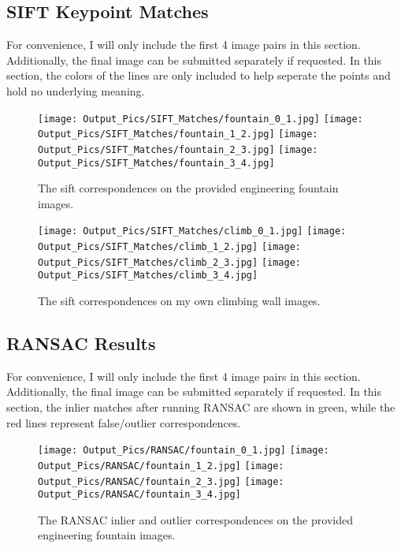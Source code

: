 \documentclass{article}
\begin{document}
\subsection{SIFT Keypoint Matches}
For convenience, I will only include the first 4 image pairs in this section. Additionally, the final image can be submitted separately if requested. In this section, the colors of the lines are only included to help seperate the points and hold no underlying meaning.
\begin{figure}[H]
    \centering
    \texttt{[image: Output\_Pics/SIFT\_Matches/fountain\_0\_1.jpg]}
    \texttt{[image: Output\_Pics/SIFT\_Matches/fountain\_1\_2.jpg]}
    \texttt{[image: Output\_Pics/SIFT\_Matches/fountain\_2\_3.jpg]}
    \texttt{[image: Output\_Pics/SIFT\_Matches/fountain\_3\_4.jpg]}
    \caption{The sift correspondences on the provided engineering fountain images.}
\end{figure}

\begin{figure}[H]
    \centering
    \texttt{[image: Output\_Pics/SIFT\_Matches/climb\_0\_1.jpg]}
    \texttt{[image: Output\_Pics/SIFT\_Matches/climb\_1\_2.jpg]}
    \texttt{[image: Output\_Pics/SIFT\_Matches/climb\_2\_3.jpg]}
    \texttt{[image: Output\_Pics/SIFT\_Matches/climb\_3\_4.jpg]}
    \caption{The sift correspondences on my own climbing wall images.}
\end{figure}

\subsection{RANSAC Results}
For convenience, I will only include the first 4 image pairs in this section. Additionally, the final image can be submitted separately if requested. In this section, the inlier matches after running RANSAC are shown in green, while the red lines represent false/outlier correspondences.

\begin{figure}[H]
    \centering
    \texttt{[image: Output\_Pics/RANSAC/fountain\_0\_1.jpg]}
    \texttt{[image: Output\_Pics/RANSAC/fountain\_1\_2.jpg]}
    \texttt{[image: Output\_Pics/RANSAC/fountain\_2\_3.jpg]}
    \texttt{[image: Output\_Pics/RANSAC/fountain\_3\_4.jpg]}
    \caption{The RANSAC inlier and outlier correspondences on the provided engineering fountain images.}
\end{figure}
\end{document}
